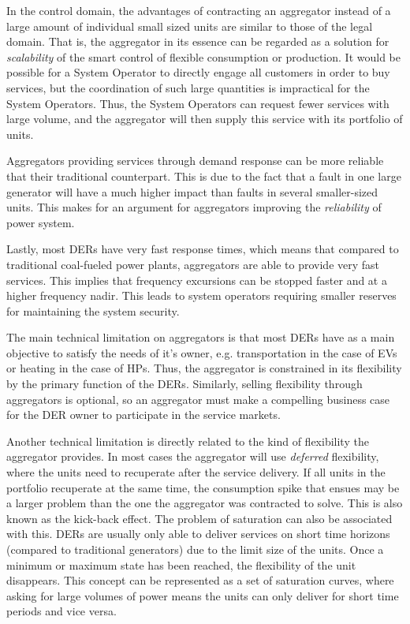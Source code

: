 In the control domain, the advantages of contracting an aggregator instead of a large amount of individual small sized units are similar to those of the legal domain. That is, the aggregator in its essence can be regarded as a solution for \emph{scalability} of the smart control of flexible consumption or production. It would be possible for a System Operator to directly engage all customers in order to buy services, but the coordination of such large quantities is impractical for the System Operators. Thus, the System Operators can request fewer services with large volume, and the aggregator will then supply this service with its portfolio of units.

Aggregators providing services through demand response can be more reliable that their traditional counterpart. This is due to the fact that a fault in one large generator will have a much higher impact than faults in several smaller-sized units. This makes for an argument for aggregators improving the \emph{reliability} of power system.

Lastly, most DERs have very fast response times, which means that compared to traditional coal-fueled power plants, aggregators are able to provide very fast services. This implies that frequency excursions can be stopped faster and at a higher frequency nadir. This leads to system operators requiring smaller reserves for maintaining  the system security.

The main technical limitation on aggregators is that most DERs have as a main objective to satisfy the needs of it's owner, e.g. transportation in the case of EVs or heating in the case of HPs. Thus, the aggregator is constrained in its flexibility by the primary function of the DERs. Similarly, selling flexibility through aggregators is optional, so an aggregator must make a compelling business case for the DER owner to participate in the service markets.

Another technical limitation is directly related to the kind of flexibility the aggregator provides. In most cases the aggregator will use \emph{deferred} flexibility, where the units need to recuperate after the service delivery. If all units in the portfolio recuperate at the same time, the consumption spike that ensues may be a larger problem than the one the aggregator was contracted to solve. This is also known as the kick-back effect. The problem of saturation can also be associated with this. DERs are usually only able to deliver services on short time horizons (compared to traditional generators) due to the limit size of the units. Once a minimum or maximum state has been reached, the flexibility of the unit disappears. This concept can be represented as a set of saturation curves, where asking for large volumes of power means the units can only deliver for short time periods and vice versa.

